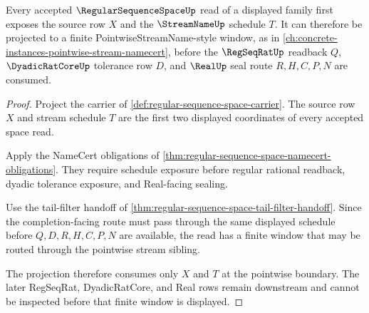 \begin{theorem}
\label{thm:regular-sequence-space-pointwise-stream-projection}
Every accepted $\RegularSequenceSpaceUp$ read of a displayed family first exposes the source row $X$ and the $\StreamNameUp$ schedule $T$. It can therefore be projected to a finite PointwiseStreamName-style window, as in \autoref{ch:concrete-instances-pointwise-stream-namecert}, before the $\RegSeqRatUp$ readback $Q$, $\DyadicRatCoreUp$ tolerance row $D$, and $\RealUp$ seal route $R,H,C,P,N$ are consumed.
\end{theorem}
\begin{proof}
Project the carrier of \autoref{def:regular-sequence-space-carrier}. The source row $X$ and stream schedule $T$ are the first two displayed coordinates of every accepted space read.

Apply the NameCert obligations of \autoref{thm:regular-sequence-space-namecert-obligations}. They require schedule exposure before regular rational readback, dyadic tolerance exposure, and Real-facing sealing.

Use the tail-filter handoff of \autoref{thm:regular-sequence-space-tail-filter-handoff}. Since the completion-facing route must pass through the same displayed schedule before $Q,D,R,H,C,P,N$ are available, the read has a finite window that may be routed through the pointwise stream sibling.

The projection therefore consumes only $X$ and $T$ at the pointwise boundary. The later RegSeqRat, DyadicRatCore, and Real rows remain downstream and cannot be inspected before that finite window is displayed.
\end{proof}

